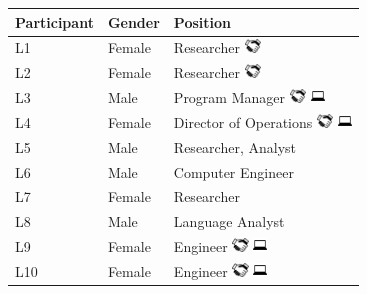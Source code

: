 \begin{table}[H]
		\begin{tabular}{lll}
		\hline 
		\textbf{Participant} & \textbf{Gender} & \textbf{Position} \\
		\hline
		L1 & Female & Researcher \includegraphics[height=1em]{Chapter-3/images/hands.png} \\
		L2 & Female & Researcher \includegraphics[height=1em]{Chapter-3/images/hands.png} \\
		L3 & Male & Program Manager \includegraphics[height=1em]{Chapter-3/images/hands.png} \includegraphics[height=1em]{Chapter-3/images/computer.png} \\
		L4 &Female&Director of Operations \includegraphics[height=1em]{Chapter-3/images/hands.png} \includegraphics[height=1em]{Chapter-3/images/computer.png} \\
		L5 & Male &Researcher, Analyst \\
		L6 & Male & Computer Engineer \\
		L7 & Female & Researcher \\ 
		L8 & Male & Language Analyst \\
		L9 & Female & Engineer \includegraphics[height=1em]{Chapter-3/images/hands.png} \includegraphics[height=1em]{Chapter-3/images/computer.png} \\
		L10 & Female & Engineer \includegraphics[height=1em]{Chapter-3/images/hands.png} \includegraphics[height=1em]{Chapter-3/images/computer.png} \\

\end{tabular}
\end{table}

